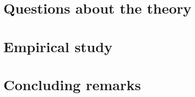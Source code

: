 \documentclass[10pt]{article}
\begin{document}
\section{Questions about the theory}


\section{Empirical study}


\section{Concluding remarks}


\newpage


\begin{refcontext}[sorting=nyt]
\printbibliography
\end{refcontext}


\newpage


\appendix

\section{}
\end{document}
